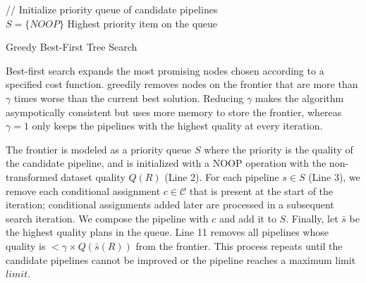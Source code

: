 {
\begin{algorithm}[t]
// Initialize priority queue of candidate pipelines\\
$S = \{NOOP\}$
\Return Highest priority item on the queue
\caption{Greedy Best-First Tree Search}
\label{alg:main}
\end{algorithm}
}

Best-first search expands the most promising nodes chosen according to a specified cost function.
 greedily removes nodes on the frontier that are more than $\gamma$ times worse than the current best solution.  Reducing $\gamma$  makes the algorithm asympotically consistent but uses more memory to store the frontier, whereas $\gamma=1$ only keeps the pipelines with the highest quality at every iteration.  

The frontier is modeled as a priority queue $S$ where the priority is the quality of the candidate pipeline, and is initialized with a NOOP operation with the non-transformed dataset quality $Q(R)$ (Line 2).  For each pipeline $s\in S$ (Line 3), we remove each conditional assignment $c\in\mathcal{C}$ that is present at the start of the iteration; conditional assignments added later are processed in a subsequent search iteration.  We compose the pipeline with $c$ and add it to $S$.
Finally, let $\bar{s}$ be the highest quality plans in the queue. Line 11 removes all pipelines whose quality is $<\gamma\times Q(\bar{s}(R))$ from the frontier.  
This process repeats until the candidate pipelines cannot be improved or the pipeline reaches a maximum limit $limit$.





